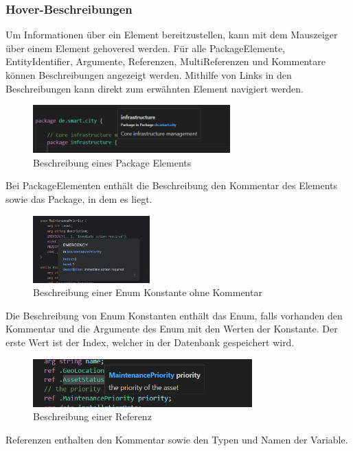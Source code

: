 \documentclass[./einleitung.tex]{subfiles}
\begin{document}
    \subsubsection{Hover-Beschreibungen}
    Um Informationen über ein Element bereitzustellen, kann mit dem Mauszeiger über einem Element gehovered werden.
    Für alle PackageElemente, EntityIdentifier, Argumente, Referenzen, MultiReferenzen und Kommentare können Beschreibungen angezeigt werden.
    Mithilfe von Links in den Beschreibungen kann direkt zum erwähnten Element navigiert werden.
    \begin{figure}[H]
        \centering
        \includegraphics[height=5em]{bilder/hover-package}
        \caption{Beschreibung eines Package Elements}
        \label{fig:hover-package}
    \end{figure}
    Bei PackageElementen enthält die Beschreibung den Kommentar des Elements sowie das Package, in dem es liegt.
    \begin{figure}[H]
        \centering
        \includegraphics[height=7em]{bilder/hover-enum-entry}
        \caption{Beschreibung einer Enum Konstante ohne Kommentar}
        \label{fig:hover-enum-entry}
    \end{figure}
    Die Beschreibung von Enum Konstanten enthält das Enum, falls vorhanden den Kommentar und die Argumente des Enum mit den Werten der Konstante.
    Der erste Wert ist der Index, welcher in der Datenbank gespeichert wird.
    \begin{figure}[H]
        \centering
        \includegraphics[height=5em]{bilder/hover-referenz}
        \caption{Beschreibung einer Referenz}
        \label{fig:hover-referenzen}
    \end{figure}
    Referenzen enthalten den Kommentar sowie den Typen und Namen der Variable.
\end{document}
